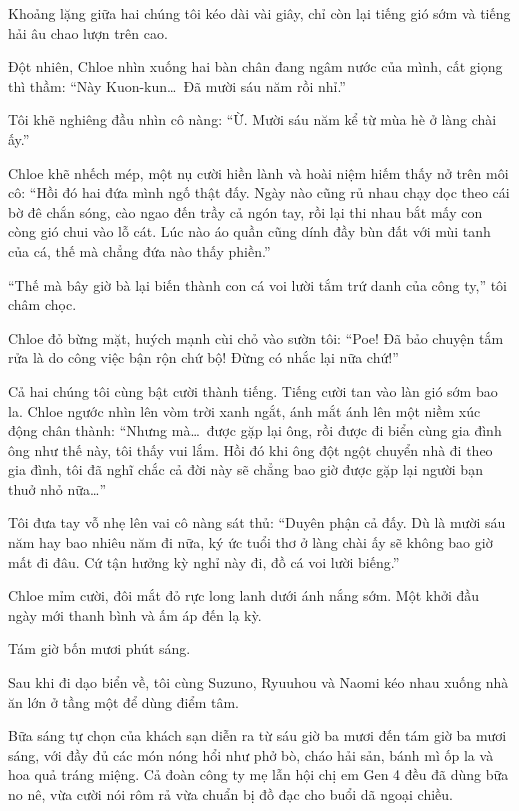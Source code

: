 \documentclass[../main.tex]{subfiles}
\begin{document}
Khoảng lặng giữa hai chúng tôi kéo dài vài giây, chỉ còn lại tiếng gió sớm và tiếng hải âu chao lượn trên cao.

Đột nhiên, Chloe nhìn xuống hai bàn chân đang ngâm nước của mình, cất giọng thì thầm: ``Này Kuon-kun\dots\ Đã mười sáu năm rồi nhỉ.''

Tôi khẽ nghiêng đầu nhìn cô nàng: ``Ừ. Mười sáu năm kể từ mùa hè ở làng chài ấy.''

Chloe khẽ nhếch mép, một nụ cười hiền lành và hoài niệm hiếm thấy nở trên môi cô: ``Hồi đó hai đứa mình ngố thật đấy. Ngày nào cũng rủ nhau chạy dọc theo cái bờ đê chắn sóng, cào ngao đến trầy cả ngón tay, rồi lại thi nhau bắt mấy con còng gió chui vào lỗ cát. Lúc nào áo quần cũng dính đầy bùn đất với mùi tanh của cá, thế mà chẳng đứa nào thấy phiền.''

``Thế mà bây giờ bà lại biến thành con cá voi lười tắm trứ danh của công ty,'' tôi châm chọc.

Chloe đỏ bừng mặt, huých mạnh cùi chỏ vào sườn tôi: ``Poe! Đã bảo chuyện tắm rửa là do công việc bận rộn chứ bộ! Đừng có nhắc lại nữa chứ!''

Cả hai chúng tôi cùng bật cười thành tiếng. Tiếng cười tan vào làn gió sớm bao la. Chloe ngước nhìn lên vòm trời xanh ngắt, ánh mắt ánh lên một niềm xúc động chân thành: ``Nhưng mà\dots\ được gặp lại ông, rồi được đi biển cùng gia đình ông như thế này, tôi thấy vui lắm. Hồi đó khi ông đột ngột chuyển nhà đi theo gia đình, tôi đã nghĩ chắc cả đời này sẽ chẳng bao giờ được gặp lại người bạn thuở nhỏ nữa\dots''

Tôi đưa tay vỗ nhẹ lên vai cô nàng sát thủ: ``Duyên phận cả đấy. Dù là mười sáu năm hay bao nhiêu năm đi nữa, ký ức tuổi thơ ở làng chài ấy sẽ không bao giờ mất đi đâu. Cứ tận hưởng kỳ nghỉ này đi, đồ cá voi lười biếng.''

Chloe mỉm cười, đôi mắt đỏ rực long lanh dưới ánh nắng sớm. Một khởi đầu ngày mới thanh bình và ấm áp đến lạ kỳ.

\ct

Tám giờ bốn mươi phút sáng.

Sau khi đi dạo biển về, tôi cùng Suzuno, Ryuuhou và Naomi kéo nhau xuống nhà ăn lớn ở tầng một để dùng điểm tâm.

Bữa sáng tự chọn của khách sạn diễn ra từ sáu giờ ba mươi đến tám giờ ba mươi sáng, với đầy đủ các món nóng hổi như phở bò, cháo hải sản, bánh mì ốp la và hoa quả tráng miệng. Cả đoàn công ty mẹ lẫn hội chị em Gen 4 đều đã dùng bữa no nê, vừa cười nói rôm rả vừa chuẩn bị đồ đạc cho buổi dã ngoại chiều.
\end{document}
